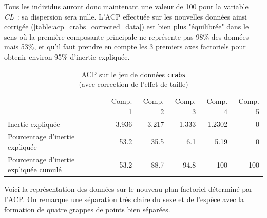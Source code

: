 \documentclass[a4paper,10pt]{report}
\begin{document}
Tous les individus auront donc maintenant une valeur de 100 pour la variable \textit{CL}~: sa dispersion sera nulle. L'ACP effectuée sur les nouvelles données ainsi corrigée (\autoref{table:acp_crabs_corrected_data}) est bien plus "équilibrée" dans le sens où la première composante principale ne représente pas 98\% des données mais 53\%, et qu'il faut prendre en compte les 3 premiers axes factoriels pour obtenir environ 95\% d'inertie expliquée.



\begin{table}[H]
	\centering
	\captionsetup{justification=centering, margin=2cm}
	\caption{ACP sur le jeu de données \texttt{crabs} \\(avec correction de l'effet de taille)}
	\label{table:acp_crabs_corrected_data}
	\begin{tabular}{lrrrrr}
		& Comp. 1 & Comp. 2 & Comp. 3 & Comp. 4 & Comp. 5 \\
		Inertie expliquée & 3.936 & 3.217 & 1.333 & 1.2302 & 0 \\
		Pourcentage d'inertie expliquée & 53.2 & 35.5 & 6.1 & 5.19 & 0 \\
		Pourcentage d'inertie expliquée cumulé & 53.2 & 88.7 & 94.8 & 100 & 100
	\end{tabular}
\end{table}



Voici la représentation des données sur le nouveau plan factoriel déterminé par l'ACP. On remarque une séparation très claire du sexe et de l'espèce avec la formation de quatre grappes de points bien séparées.
\end{document}
